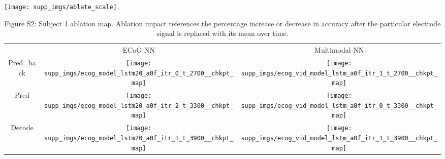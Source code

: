 \documentclass{article}
\begin{document}
\centering
\texttt{[image: supp\_imgs/ablate\_scale]}
\begin{table}[h!]
  \centering
  \begin{adjustbox}{max width=\textwidth}
  \begin{tabular}{  c  c  c  }
    
     & ECoG NN & Multimodal NN \\ 
    Pred\_back &
    \begin{minipage}{.55\textwidth}
      \texttt{[image: supp\_imgs/ecog\_model\_lstm20\_a0f\_itr\_0\_t\_2700\_\_chkpt\_map]}
    \end{minipage}
    & 
    \begin{minipage}{.55\textwidth}
      \texttt{[image: supp\_imgs/ecog\_vid\_model\_lstm\_a0f\_itr\_1\_t\_2700\_\_chkpt\_map]}
    \end{minipage} \\ 
    
        Pred & 
    \begin{minipage}{.55\textwidth}
      \texttt{[image: supp\_imgs/ecog\_model\_lstm20\_a0f\_itr\_2\_t\_3300\_\_chkpt\_map]}
    \end{minipage}
    &
    \begin{minipage}{.55\textwidth}
      \texttt{[image: supp\_imgs/ecog\_vid\_model\_lstm\_a0f\_itr\_0\_t\_3300\_\_chkpt\_map]}
    \end{minipage} \\ 
    
        Decode &
    \begin{minipage}{.55\textwidth}
      \texttt{[image: supp\_imgs/ecog\_model\_lstm20\_a0f\_itr\_1\_t\_3900\_\_chkpt\_map]}
    \end{minipage}
    &
    \begin{minipage}{.55\textwidth}
      \texttt{[image: supp\_imgs/ecog\_vid\_model\_lstm\_a0f\_itr\_1\_t\_3900\_\_chkpt\_map]}
    \end{minipage} \\ 
  \end{tabular}
  \end{adjustbox}
  \caption*{Figure S2: Subject 1 ablation map. Ablation impact references the percentage increase or decrease in accuracy after the particular electrode signal is replaced with its mean over time. }\label{tbl:s1_ablate}
\end{table}
\newpage
\end{document}
